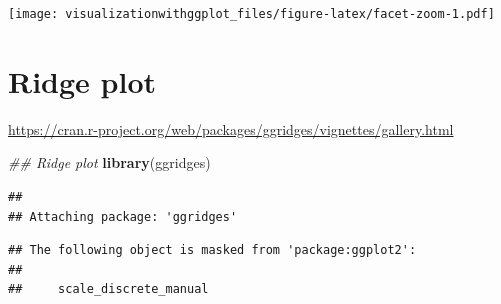 \documentclass[]{krantz}
\makeatletter
\newenvironment{Shaded}{\begin{snugshade}}{\end{snugshade}}
\newcommand{\CommentTok}[1]{\textcolor[rgb]{0.56,0.35,0.01}{\textit{#1}}}
\newcommand{\DataTypeTok}[1]{\textcolor[rgb]{0.13,0.29,0.53}{#1}}
\newcommand{\DecValTok}[1]{\textcolor[rgb]{0.00,0.00,0.81}{#1}}
\newcommand{\FloatTok}[1]{\textcolor[rgb]{0.00,0.00,0.81}{#1}}
\newcommand{\KeywordTok}[1]{\textcolor[rgb]{0.13,0.29,0.53}{\textbf{#1}}}
\newcommand{\NormalTok}[1]{#1}
\newcommand{\OperatorTok}[1]{\textcolor[rgb]{0.81,0.36,0.00}{\textbf{#1}}}
\newcommand{\StringTok}[1]{\textcolor[rgb]{0.31,0.60,0.02}{#1}}
\newenvironment{kframe}{%
\medskip{}
\setlength{\fboxsep}{.8em}
 \def\at@end@of@kframe{}%
 \ifinner\ifhmode%
  \def\at@end@of@kframe{\end{minipage}}%
  \begin{minipage}{\columnwidth}%
 \fi\fi%
 \def\FrameCommand##1{\hskip\@totalleftmargin \hskip-\fboxsep
 \colorbox{shadecolor}{##1}\hskip-\fboxsep
     \hskip-\linewidth \hskip-\@totalleftmargin \hskip\columnwidth}%
 \MakeFramed {\advance\hsize-\width
   \@totalleftmargin\z@ \linewidth\hsize
   \@setminipage}}%
 {\par\unskip\endMakeFramed%
 \at@end@of@kframe}
\renewenvironment{Shaded}{\begin{kframe}}{\end{kframe}}
\makeatother
\begin{document}
\texttt{[image: visualizationwithggplot\_files/figure-latex/facet-zoom-1.pdf]}

\hypertarget{ridge-plot}{%
\section{Ridge plot}\label{ridge-plot}}

\url{https://cran.r-project.org/web/packages/ggridges/vignettes/gallery.html}

\begin{Shaded}
\begin{Highlighting}[]
\CommentTok{## Ridge plot}
\KeywordTok{library}\NormalTok{(ggridges)}
\end{Highlighting}
\end{Shaded}

\begin{verbatim}
## 
## Attaching package: 'ggridges'
\end{verbatim}

\begin{verbatim}
## The following object is masked from 'package:ggplot2':
## 
##     scale_discrete_manual
\end{verbatim}

\begin{Shaded}
\end{Shaded}
\end{document}
